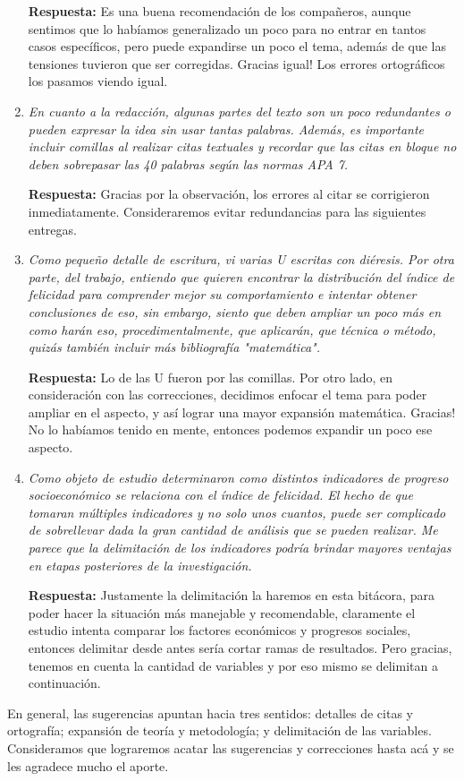 \begin{enumerate}
    \textbf{Respuesta:} Es una buena recomendación de los compañeros, aunque sentimos que lo habíamos generalizado un poco para no entrar en tantos casos específicos, pero puede expandirse un poco el tema, además de que las tensiones tuvieron que ser corregidas. Gracias igual! Los errores ortográficos los pasamos viendo igual. 

    \item \textit{En cuanto a la redacción, algunas partes del texto son un poco redundantes o pueden expresar la idea sin usar tantas palabras. Además, es importante incluir comillas al realizar citas textuales y recordar que las citas en bloque no deben sobrepasar las 40 palabras según las normas APA 7.}

    \textbf{Respuesta:} Gracias por la observación, los errores al citar se corrigieron inmediatamente. Consideraremos evitar redundancias para las siguientes entregas.

    \item \textit{Como pequeño detalle de escritura, vi varias U escritas con diéresis. Por otra parte, del trabajo, entiendo que quieren encontrar la distribución del índice de felicidad para comprender mejor su comportamiento e intentar obtener conclusiones de eso, sin embargo, siento que deben ampliar un poco más en como harán eso, procedimentalmente, que aplicarán, que técnica o método, quizás también incluir más bibliografía "matemática".}

    \textbf{Respuesta:} Lo de las U fueron por las comillas. Por otro lado, en consideración con las correcciones, decidimos enfocar el tema para poder ampliar en el aspecto, y así lograr una mayor expansión matemática. Gracias! No lo habíamos tenido en mente, entonces podemos expandir un poco ese aspecto.
    
    \item \textit{Como objeto de estudio determinaron como distintos indicadores de progreso socioeconómico se relaciona con el índice de felicidad. El hecho de que tomaran múltiples indicadores y no solo unos cuantos, puede ser complicado de sobrellevar dada la gran cantidad de análisis que se pueden realizar. Me parece que la delimitación de los indicadores podría brindar mayores ventajas en etapas posteriores de la investigación.} 

    \textbf{Respuesta:} Justamente la delimitación la haremos en esta bitácora, para poder hacer la situación más manejable y recomendable, claramente el estudio intenta comparar los factores económicos y progresos sociales, entonces delimitar desde antes sería cortar ramas de resultados. Pero gracias, tenemos en cuenta la cantidad de variables y por eso mismo se delimitan a continuación. 
    
\end{enumerate}

En general, las sugerencias apuntan hacia tres sentidos: detalles de citas y ortografía; expansión de teoría y metodología; y delimitación de las variables. Consideramos que lograremos acatar las sugerencias y correcciones hasta acá y se les agradece mucho el aporte. 